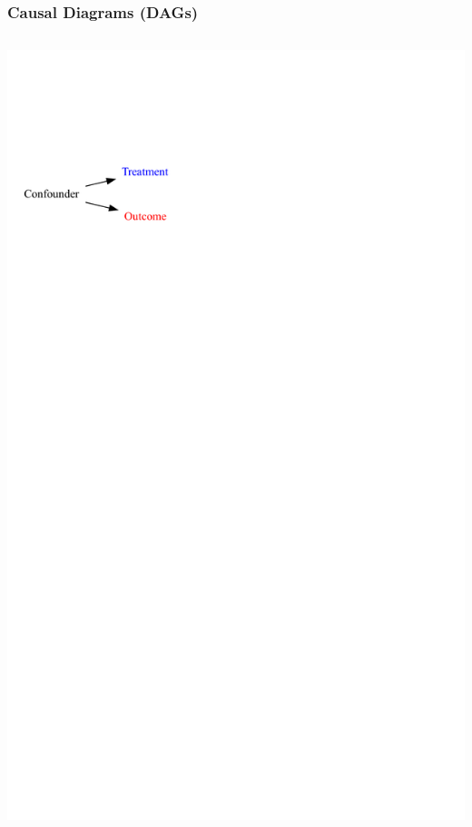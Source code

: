 \documentclass[xcolor=x11names,compress]{beamer}\usepackage[]{graphicx}\usepackage[]{color}
\newenvironment{knitrout}{}{} %
\renewcommand{\(}{\begin{columns}}
\renewcommand{\)}{\end{columns}}
\newcommand{\<}[1]{\begin{column}{#1}}
\renewcommand{\>}{\end{column}}
\begin{document}
\begin{frame}
\frametitle{Causal Diagrams (DAGs)}
\begin{columns}
\begin{column}{0.5\textwidth}
\begin{knitrout}
\color{fgcolor}
\includegraphics[width=1.8\linewidth]{figure/Dag2_a-1} 


\end{knitrout}
\end{column}
\end{columns}
\end{frame}
\end{document}
